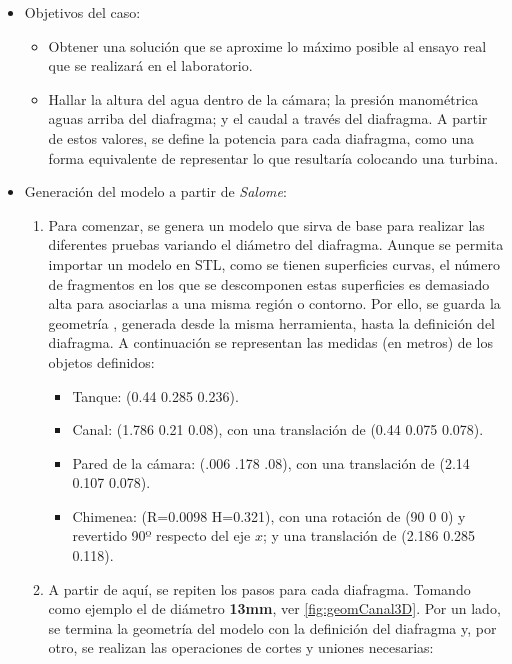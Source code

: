\begin{itemize}
\item
  Objetivos del caso:

  \begin{itemize}
  \item
    Obtener una solución que se aproxime lo máximo posible al ensayo
    real que se realizará en el laboratorio.
  \item
    Hallar la altura del agua dentro de la cámara; la presión
    manométrica aguas arriba del diafragma; y el caudal a través del
    diafragma. A partir de estos valores, se define la potencia para
    cada diafragma, como una forma equivalente de representar lo que
    resultaría colocando una turbina.
  \end{itemize}
\item
  Generación del modelo a partir de \emph{Salome}:

  \begin{enumerate}
  \def\labelenumi{\arabic{enumi}.}
  \item
    Para comenzar, se genera un modelo que sirva de base para realizar
    las diferentes pruebas variando el diámetro del diafragma. Aunque se
    permita importar un modelo en STL, como se tienen superficies
    curvas, el número de fragmentos en los que se descomponen estas
    superficies es demasiado alta para asociarlas a una misma región o
    contorno. Por ello, se guarda la geometría , generada desde la misma
    herramienta, hasta la definición del diafragma. A continuación se
    representan las medidas (en metros) de los objetos definidos:

    \begin{itemize}
    \item
      Tanque: (0.44 0.285 0.236).
    \item
      Canal: (1.786 0.21 0.08), con una translación de (0.44 0.075 0.078).
    \item
      Pared de la cámara: (.006 .178 .08), con una translación de (2.14
      0.107 0.078).
    \item
      Chimenea: (R=0.0098 H=0.321), con una rotación de (90 0 0) y
      revertido 90º respecto del eje $x$; y una translación de (2.186
      0.285 0.118).
    \end{itemize}
  \item
    A partir de aquí, se repiten los pasos para cada diafragma. Tomando
    como ejemplo el de diámetro \textbf{13mm}, ver \autoref{fig:geomCanal3D}. Por un lado, se termina
    la geometría del modelo con la definición del diafragma y, por otro,
    se realizan las operaciones de cortes y uniones necesarias:


\end{enumerate}
\end{itemize}
